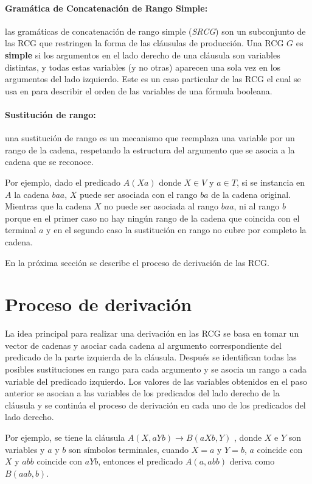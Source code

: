 \paragraph{Gramática de Concatenación de Rango Simple:} las gramáticas de concatenación de rango simple 
(\textit{SRCG}) son un subconjunto de las RCG que restringen la forma de las cláusulas de producción.  
Una RCG $G$ es \textbf{simple} si los argumentos en el lado derecho de una cláusula son variables distintas, 
y todas estas variables (y no otras) aparecen una sola vez en los argumentos del lado izquierdo.  
Este es un caso particular de las RCG el cual se usa en \cite{aSRCSAT} para describir el orden de las variables de una fórmula booleana.

\paragraph{Sustitución de rango:} una sustitución de rango es un mecanismo que reemplaza una variable por un 
rango de la cadena, respetando la estructura del argumento que se asocia a la cadena que se reconoce. 

Por ejemplo, dado el predicado $A(Xa)$ donde $X \in V$ y $a \in T$, si se instancia en $A$ la cadena $baa$, $X$ puede ser asociada con el rango $ba$ de la cadena original. Mientras
que la cadena $X$ no puede ser asociada al rango $baa$, ni al rango $b$ porque en el primer caso no hay ningún rango de la cadena
que coincida con el terminal $a$ y en el segundo caso la sustitución en rango no cubre por completo la cadena.

En la próxima sección se describe el proceso de derivación de las RCG.
\section{Proceso de derivación}

La idea principal para realizar una derivación en las RCG se basa en tomar un vector de cadenas y asociar cada 
cadena al argumento correspondiente del predicado de la parte izquierda de la cláusula. Después se identifican 
todas las posibles sustituciones en rango para cada argumento y se asocia un rango a cada variable del predicado
izquierdo. Los valores de las variables obtenidos en el paso anterior se asocian a las variables de los predicados
del lado derecho de la cláusula y se continúa el proceso de derivación en cada uno de los predicados del lado
derecho.

Por ejemplo, se tiene la cláusula $A(X,aYb)\to B(aXb,Y)$ , donde $X$ e $Y$ son variables y $a$ y $b$ son símbolos terminales, cuando $ X=a$ y $Y=b$, $a$ coincide con $X$ y $abb$ coincide con $aYb$, entonces el predicado $A(a,abb)$ deriva como $B(aab,b)$.

